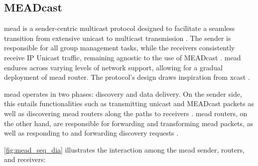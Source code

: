 \subsection{MEADcast} %
\label{sub:MEADcast}
\gls{mead} is a sender-centric multicast protocol designed to facilitate a
    seamless transition from extensive unicast to multicast transmission
    \cite{meadcast2}.
The sender is responsible for all group management tasks, while the receivers
    consistently receive IP Unicast traffic, remaining agnostic to the use
    of MEADcast \cite{meadcast1}.
\gls{mead} endures across varying levels of network support, allowing for a
    gradual deployment of \gls{mead} router.
The protocol's design draws inspiration from \gls{xcast} \cite{meadcast1}.

\gls{mead} operates in two phases: discovery and data delivery.
On the sender side, this entails functionalities such as transmitting unicast
    and MEADcast packets as well as discovering \gls{mead} routers along the
    paths to receivers \cite{meadcast2}.
\gls{mead} routers, on the other hand, are responsible for forwarding and
    transforming \gls{mead} packets, as well as responding to and forwarding
    discovery requests \cite{meadcast2}.

\autoref{fig:mead_seq_dia} illustrates the interaction among the \gls{mead}
    sender, routers, and receivers: \cite{meadcast2}

